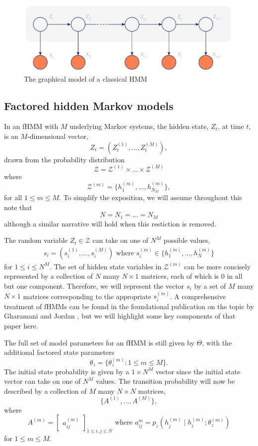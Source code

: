 \documentclass{amsart}
\begin{document}
\begin{figure}
\centering
\includegraphics[scale=0.5]{figures/hmm.jpg}
\caption{The graphical model of a classical HMM}\label{fig:HMM}
\end{figure}

\subsection{Factored hidden Markov models}
In an fHMM with $M$ underlying Markov systems, the hidden state, $Z_t$, at time $t$, is an $M$-dimensional vector,
\[
Z_t = (Z_{t}^{(1)},...,Z_{t}^{(M)}),
\]
drawn from the probability distribution
\[
\mathcal Z = \mathcal{Z}^{(1)}\times ...\times \mathcal{Z}^{(M)}
\]
where 
\[
\mathcal Z^{(m)} = \{h_1^{(m)},...,h_{N_M}^{(m)}\}, 
\]
for all $1\leq m\leq M$.  To simplify the exposition, we will assume throughout this note that 
\[
N = N_1 = ...= N_M
\]
although a similar narrative will hold when this restiction is removed. 

The random variable $Z_t\in \mathcal Z$ can take on one of $N^M$ possible values, 
\begin{eqnarray}\label{eqn:vec}
s_i = (s_{i}^{(1)},...,s_{i}^{(M)})\text{ where }s_i^{(m)}\in \{h_1^{(m)},...,h_{N}^{(m)}\}
\end{eqnarray}
for $1\leq i\leq N^M$.  The set of hidden 
state variables in $\mathcal Z^{(m)}$ can be more concisely 
represented by a collection of $N$ 
many $N\times 1$ matrices, each 
of which is 0 in all but one component.  Therefore, we will represent the vector $s_i$ by a 
set of $M$ many $N\times1$ matrices corresponding to the appropriate 
$s_i^{(m)}$. A comprehensive treatment of fHMMs can be found in the foundational publication 
on the topic by Gharamani and Jordan \cite{GJ95}, but we will highlight some 
key components of that paper here.  

The full set of model parameters for an fHMM is 
still given by $\Theta$, with the additional factored state parameters 
\[
\theta_z = \{\theta_z^{(m)}:1\leq m \leq M\}.
\]
The initial state probability is given by 
a $1\times N^M$ vector since the initial state vector can take on one of $N^M$ values.  
The transition probability will now be described by a collection of $M$ many $N\times N$ matrices, 
\[
\{A^{(1)},...,A^{(M)}\},
\]
where 
\[
A^{(m)} = \begin{bmatrix}
a_{ij}^{(m)}
\end{bmatrix}_{1\leq i,j\leq N}\text{ where } a_{ij}^m = p_z(h_j^{(m)}\mid 
h_i^{(m)}; \theta_z^{(m)})
\]
for $1\leq m\leq M$.
\end{document}
